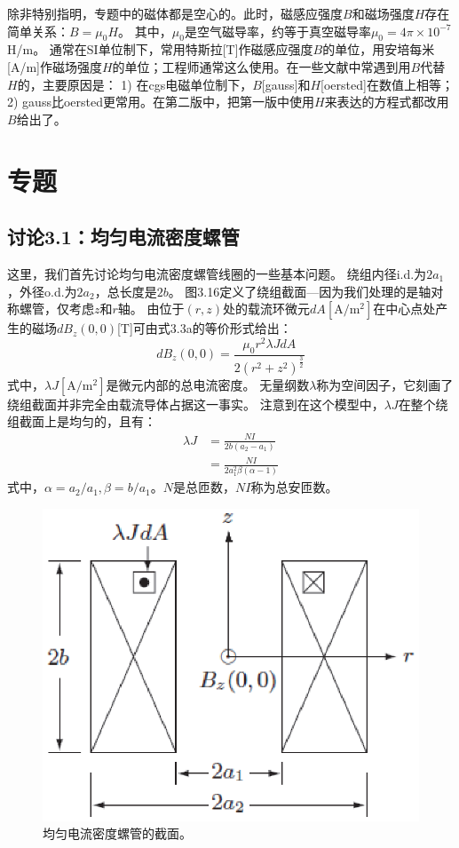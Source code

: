 除非特别指明，专题中的磁体都是空心的。此时，磁感应强度$B$和磁场强度$H$存在简单关系：$B=\mu_0 H$。
其中，$\mu_0$是空气磁导率，约等于真空磁导率$\mu_0=4\pi\times 10^{-7}$ H/m。
通常在SI单位制下，常用特斯拉[T]作磁感应强度$B$的单位，用安培每米[A/m]作磁场强度$H$的单位；工程师通常这么使用。在一些文献中常遇到用$B$代替$H$的，主要原因是：
1) 在cgs电磁单位制下，$B$[gauss]和$H$[oersted]在数值上相等；
2) gauss比oersted更常用。在第二版中，把第一版中使用$H$来表达的方程式都改用$B$给出了。

\newpage
\section{专题}
\subsection{讨论3.1：均匀电流密度螺管}

这里，我们首先讨论均匀电流密度螺管线圈的一些基本问题。
绕组内径i.d.为$2a_1$，外径o.d.为$2a_2$，总长度是$2b$。
图3.16定义了绕组截面---因为我们处理的是轴对称螺管，仅考虑$z$和$r$轴。
由位于$(r,z)$处的载流环微元$dA\mathrm{[A/m^2]}$在中心点处产生的磁场$dB_z(0, 0)$[T]可由式3.3a的等价形式给出：
\begin{equation}
dB_z(0,0)=\frac{\mu_0r^2\lambda JdA}{2(r^2+z^2)^\frac{3}{2}}%
\end{equation}
式中，$\lambda J\mathrm{[A/m^2]}$是微元内部的总电流密度。
无量纲数$\lambda$称为空间因子，它刻画了绕组截面并非完全由载流导体占据这一事实。
注意到在这个模型中，$\lambda J$在整个绕组截面上是均匀的，且有：
\begin{subequations}
\begin{align}
\lambda J&=\frac{NI}{2b(a_2-a_1)}\\
&=\frac{NI}{2a_1^2\beta(\alpha-1)}%
\end{align}
\end{subequations}
式中，$\alpha=a_2/a_1,\beta=b/a_1$。$N$是总匝数，$NI$称为总安匝数。
\begin{figure}[htbp]
  \centering
 \includegraphics[scale=0.7]{chpt3/figs/fig3.16.eps}
  \caption{均匀电流密度螺管的截面。}
\end{figure}

